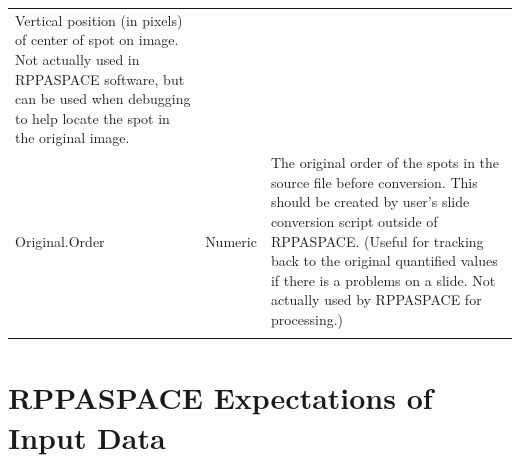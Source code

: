 \documentclass[
]{article}
\begin{document}
\begin{longtable}[]{@{}lll@{}}
\begin{minipage}[t]{0.40\columnwidth}
Vertical position (in pixels) of center of spot on image. Not actually
used in RPPASPACE software, but can be used when debugging to help
locate the spot in the original image.\strut
\end{minipage}\tabularnewline
\begin{minipage}[t]{0.26\columnwidth}\raggedright
Original.Order\strut
\end{minipage} & \begin{minipage}[t]{0.26\columnwidth}\raggedright
Numeric\strut
\end{minipage} & \begin{minipage}[t]{0.40\columnwidth}\raggedright
The original order of the spots in the source file before conversion.
This should be created by user's slide conversion script outside of
RPPASPACE. (Useful for tracking back to the original quantified values
if there is a problems on a slide. Not actually used by RPPASPACE for
processing.)\strut
\end{minipage}\tabularnewline
\begin{minipage}[t]{0.26\columnwidth}\raggedright
\strut
\end{minipage} & \begin{minipage}[t]{0.26\columnwidth}\raggedright
\strut
\end{minipage} & \begin{minipage}[t]{0.40\columnwidth}\raggedright
\strut
\end{minipage}\tabularnewline
\bottomrule
\end{longtable}

\hypertarget{expectations}{%
\section{RPPASPACE Expectations of Input Data}\label{expectations}}
\end{document}
